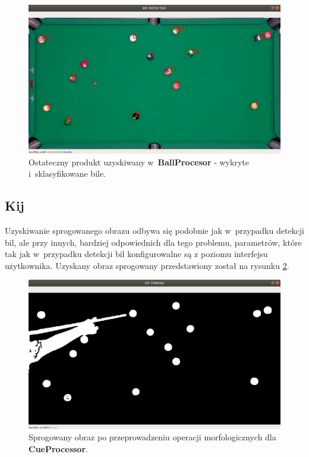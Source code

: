 \documentclass[12pt]{article}
\begin{document}
    \begin{figure}[!htb]
        \centering
        \includegraphics[width=15cm]{./images/obrazki/klasyfikacja/bp_classified.png}
        \caption{Ostateczny produkt uzyskiwany w~\textbf{BallProcesor} - wykryte i~sklasyfikowane bile.}
        \label{bp_classified}
    \end{figure}

\subsection{Kij}

Uzyskiwanie sprogowanego obrazu odbywa się podobnie jak w~przypadku detekcji bil, ale przy innych, bardziej odpowiednich dla tego problemu, parametrów, które tak jak w~przypadku detekcji bil konfigurowalne są z poziomu interfejsu użytkownika. Uzyskany obraz sprogowany przedstawiony został na rysunku \ref{cp_thresh}.

\begin{figure}[!htb]
    \centering
    \includegraphics[width=15cm]{./images/obrazki/cp/cp_thresh.png}
    \caption{Sprogowany obraz po przeprowadzeniu operacji morfologicznych dla \textbf{CueProcessor}.}
    \label{cp_thresh}
\end{figure}
\end{document}

